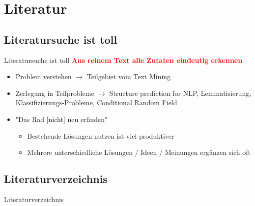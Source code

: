 \documentclass[12pt]{beamer}
\begin{document}
\section{Literatur}
\subsection{Literatursuche ist toll}
\begin{frame}{Literatursuche ist toll}
	\textbf{\textcolor{red}{Aus reinem Text alle Zutaten eindeutig erkennen}}
	\begin{itemize}
		\item Problem verstehen $\rightarrow$ Teilgebiet vom Text Mining 
		\item Zerlegung in Teilprobleme $\rightarrow$ Structure prediction for NLP, Lemmatisierung, Klassifizierungs-Probleme, Conditional Random Field
		\item "Das Rad [nicht] neu erfinden"
		\begin{itemize}
			\item Bestehende Lösungen nutzen ist viel produktiver
			\item Mehrere unterschiedliche Lösungen / Ideen / Meinungen ergänzen sich oft
		\end{itemize}
	\end{itemize}
\end{frame}


\subsection{Literaturverzeichnis}
\begin{frame}[t,allowframebreaks]{Literaturverzeichnis}
	\printbibliography[heading=none]
\end{frame}
\end{document}
